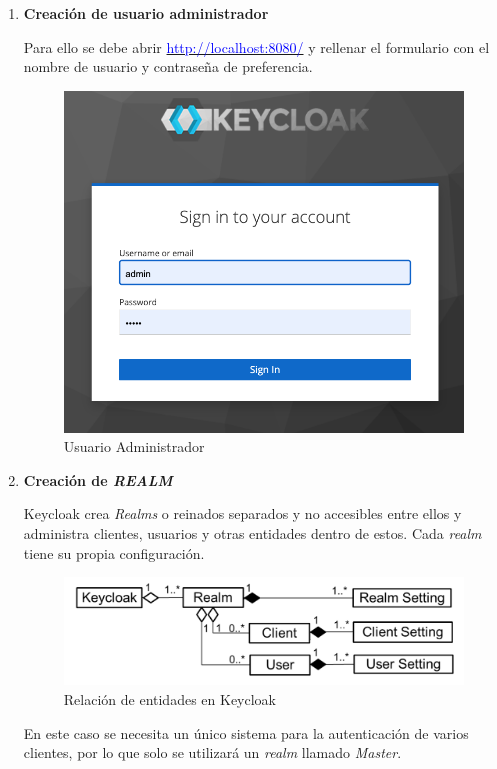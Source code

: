 \begin{enumerate}
	\item \textbf{Creación de usuario administrador}
	
	Para ello se debe abrir \href{http://localhost:8080/}{\textcolor{blue}{http://localhost:8080/}}
	y rellenar el formulario con el nombre de usuario y contraseña de preferencia.
	
	\begin{figure}[H]
		\centering
		\includegraphics[width=0.7\linewidth]{Graphics/admin_console}
		\caption{Usuario Administrador}
		\label{fig:adminconsole}
	\end{figure}
	
	
	\item \textbf{Creación de \textit{REALM}}
	
	Keycloak crea \textit{Realms} o reinados separados y no accesibles entre ellos y administra clientes, usuarios y otras entidades dentro de estos. Cada \textit{realm} tiene su propia configuración.
	\begin{figure}[H]
		\centering
		\includegraphics[width=0.9\linewidth]{Graphics/keycloak_realm}
		\caption{Relación de entidades en Keycloak}
		\label{fig:keycloakrealm}
	\end{figure}
	En este caso se necesita un único sistema para la autenticación de varios clientes, por lo que solo se utilizará un \textit{realm} llamado \textit{Master}.
	

\end{enumerate}
